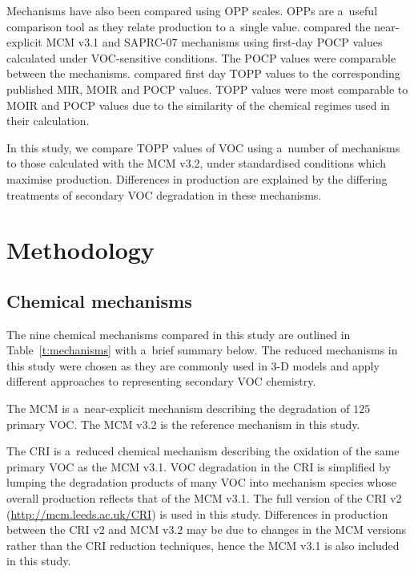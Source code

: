 \documentclass[acpd, online, hvmath]{copernicus}
\begin{document}
Mechanisms have also been compared using OPP scales.  OPPs are
a~useful comparison tool as they relate  production to
a~single value.  \citet{Derwent:2010} compared the near-explicit MCM
v3.1 and SAPRC-07 mechanisms using first-day POCP values calculated
under VOC-sensitive conditions.  The POCP values were comparable
between the mechanisms.  \citet{Butler:2011} compared first day TOPP
values to the corresponding published MIR, MOIR and POCP values.  TOPP
values were most comparable to MOIR and POCP values due to the
similarity of the chemical regimes used in their calculation.

In this study, we compare TOPP values of VOC using a~number of
mechanisms to those calculated with the MCM v3.2, under standardised
conditions which maximise  production.  Differences in
 production are explained by the differing treatments of
secondary VOC degradation in these mechanisms.



\section{Methodology}
\label{s:methodology}


\subsection{Chemical mechanisms}
\label{ss:mechanisms}

The nine chemical mechanisms compared in this study are outlined in
Table~\ref{t:mechanisms} with a~brief summary below.  The reduced
mechanisms in this study were chosen as they are commonly used in 3-D
models and apply different approaches to representing secondary VOC
chemistry.

The MCM \citep{Jenkin:1997, Jenkin:2003, Saunders:2003, Bloss:2005,
  MCM_Site} is a~near-explicit mechanism describing the degradation of
$125$ primary VOC.  The MCM v3.2 is the reference mechanism in this
study.

The CRI \citep{Jenkin:2008} is a~reduced chemical mechanism describing
the oxidation of the same primary VOC as the MCM v3.1.  VOC
degradation in the CRI is simplified by lumping the degradation
products of many VOC into mechanism species whose overall 
production reflects that of the MCM v3.1.  The full version of the CRI
v2 (\url{http://mcm.leeds.ac.uk/CRI}) is used in this study.
Differences in  production between the CRI v2 and MCM v3.2
may be due to changes in the MCM versions rather than the CRI
reduction techniques, hence the MCM v3.1 is also included in this
study.
\end{document}
